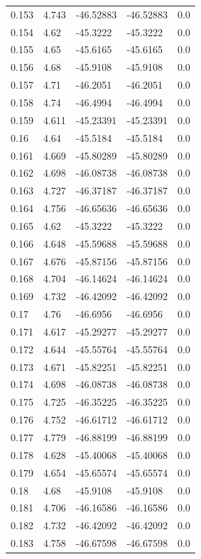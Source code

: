 \begin{tabular}{lllll}
0.153 & 4.743 & -46.52883 & -46.52883 & 0.0 \\
0.154 & 4.62 & -45.3222 & -45.3222 & 0.0 \\
0.155 & 4.65 & -45.6165 & -45.6165 & 0.0 \\
0.156 & 4.68 & -45.9108 & -45.9108 & 0.0 \\
0.157 & 4.71 & -46.2051 & -46.2051 & 0.0 \\
0.158 & 4.74 & -46.4994 & -46.4994 & 0.0 \\
0.159 & 4.611 & -45.23391 & -45.23391 & 0.0 \\
0.16 & 4.64 & -45.5184 & -45.5184 & 0.0 \\
0.161 & 4.669 & -45.80289 & -45.80289 & 0.0 \\
0.162 & 4.698 & -46.08738 & -46.08738 & 0.0 \\
0.163 & 4.727 & -46.37187 & -46.37187 & 0.0 \\
0.164 & 4.756 & -46.65636 & -46.65636 & 0.0 \\
0.165 & 4.62 & -45.3222 & -45.3222 & 0.0 \\
0.166 & 4.648 & -45.59688 & -45.59688 & 0.0 \\
0.167 & 4.676 & -45.87156 & -45.87156 & 0.0 \\
0.168 & 4.704 & -46.14624 & -46.14624 & 0.0 \\
0.169 & 4.732 & -46.42092 & -46.42092 & 0.0 \\
0.17 & 4.76 & -46.6956 & -46.6956 & 0.0 \\
0.171 & 4.617 & -45.29277 & -45.29277 & 0.0 \\
0.172 & 4.644 & -45.55764 & -45.55764 & 0.0 \\
0.173 & 4.671 & -45.82251 & -45.82251 & 0.0 \\
0.174 & 4.698 & -46.08738 & -46.08738 & 0.0 \\
0.175 & 4.725 & -46.35225 & -46.35225 & 0.0 \\
0.176 & 4.752 & -46.61712 & -46.61712 & 0.0 \\
0.177 & 4.779 & -46.88199 & -46.88199 & 0.0 \\
0.178 & 4.628 & -45.40068 & -45.40068 & 0.0 \\
0.179 & 4.654 & -45.65574 & -45.65574 & 0.0 \\
0.18 & 4.68 & -45.9108 & -45.9108 & 0.0 \\
0.181 & 4.706 & -46.16586 & -46.16586 & 0.0 \\
0.182 & 4.732 & -46.42092 & -46.42092 & 0.0 \\
0.183 & 4.758 & -46.67598 & -46.67598 & 0.0 \\

\end{tabular}
